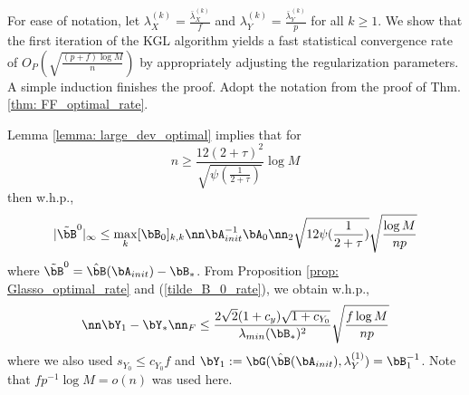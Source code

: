 \begin{IEEEproof}
For ease of notation, let $\lambda_X^{(k)}=\frac{\bar{\lambda}_X^{(k)}}{f}$ and $\lambda_Y^{(k)}=\frac{\bar{\lambda}_Y^{(k)}}{p}$ for all $k \geq 1$. We show that the first iteration of the KGL algorithm yields a fast statistical convergence rate of $O_P\left( \sqrt{\frac{(p+f)\log M}{n}} \right)$ by appropriately adjusting the regularization parameters. A simple induction finishes the proof. %
Adopt the notation from the proof of Thm. \ref{thm: FF_optimal_rate}.


Lemma \ref{lemma: large_dev_optimal} implies that for
\begin{equation} \label{condition_0}
	n \geq \frac{12 (2+\tau)^2}{\sqrt{\psi(\frac{1}{2+\tau})}} \log M
\end{equation}
then w.h.p.,
\begin{equation} \label{tilde_B_0_rate}
	|\tilde{\bB}^0|_\infty \leq \max_k [\bB_0]_{k,k} \nn\bA_{init}^{-1} \bA_0\nn_2 \sqrt{12 \psi(\frac{1}{2+\tau})} \sqrt{\frac{\log M}{np}}
\end{equation}
where $\tilde{\bB}^0=\hat{\bB}(\bA_{init})-\bB_*$. From Proposition \ref{prop: Glasso_optimal_rate} and (\ref{tilde_B_0_rate}), we obtain w.h.p.,
\begin{equation} \label{Y_Frob_error}
	\nn \bY_1-\bY_* \nn_F \leq \frac{2\sqrt{2} (1+c_y) \sqrt{1+c_{Y_0}}}{\lambda_{min}(\bB_*)^2} \sqrt{\frac{f\log M}{np}}
\end{equation}
where we also used $s_{Y_0}\leq c_{Y_0} f$ and $\bY_1:=\bG(\hat{\bB}(\bA_{init}),\lambda_Y^{(1)})=\bB_1^{-1}$. Note that $fp^{-1}\log M=o(n)$ was used here.



\end{IEEEproof}
